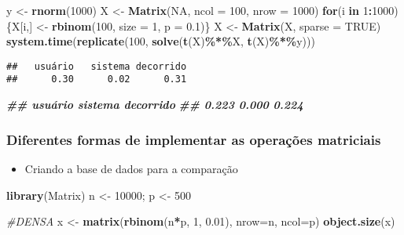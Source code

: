 \documentclass[
]{article}
\newenvironment{Shaded}{\begin{snugshade}}{\end{snugshade}}
\newcommand{\AttributeTok}[1]{\textcolor[rgb]{0.13,0.29,0.53}{#1}}
\newcommand{\CommentTok}[1]{\textcolor[rgb]{0.56,0.35,0.01}{\textit{#1}}}
\newcommand{\ConstantTok}[1]{\textcolor[rgb]{0.56,0.35,0.01}{#1}}
\newcommand{\ControlFlowTok}[1]{\textcolor[rgb]{0.13,0.29,0.53}{\textbf{#1}}}
\newcommand{\DecValTok}[1]{\textcolor[rgb]{0.00,0.00,0.81}{#1}}
\newcommand{\DocumentationTok}[1]{\textcolor[rgb]{0.56,0.35,0.01}{\textbf{\textit{#1}}}}
\newcommand{\FloatTok}[1]{\textcolor[rgb]{0.00,0.00,0.81}{#1}}
\newcommand{\FunctionTok}[1]{\textcolor[rgb]{0.13,0.29,0.53}{\textbf{#1}}}
\newcommand{\NormalTok}[1]{#1}
\newcommand{\OtherTok}[1]{\textcolor[rgb]{0.56,0.35,0.01}{#1}}
\newcommand{\SpecialCharTok}[1]{\textcolor[rgb]{0.81,0.36,0.00}{\textbf{#1}}}
\providecommand{\tightlist}{%
  \setlength{\itemsep}{0pt}\setlength{\parskip}{0pt}}
\begin{document}
\begin{Shaded}
\begin{Highlighting}[]
\NormalTok{y }\OtherTok{\textless{}{-}} \FunctionTok{rnorm}\NormalTok{(}\DecValTok{1000}\NormalTok{)}
\NormalTok{X }\OtherTok{\textless{}{-}} \FunctionTok{Matrix}\NormalTok{(}\ConstantTok{NA}\NormalTok{, }\AttributeTok{ncol =} \DecValTok{100}\NormalTok{, }\AttributeTok{nrow =} \DecValTok{1000}\NormalTok{)}
\ControlFlowTok{for}\NormalTok{(i }\ControlFlowTok{in} \DecValTok{1}\SpecialCharTok{:}\DecValTok{1000}\NormalTok{) \{X[i,] }\OtherTok{\textless{}{-}} \FunctionTok{rbinom}\NormalTok{(}\DecValTok{100}\NormalTok{, }\AttributeTok{size =} \DecValTok{1}\NormalTok{, }\AttributeTok{p =} \FloatTok{0.1}\NormalTok{)\}}
\NormalTok{X }\OtherTok{\textless{}{-}} \FunctionTok{Matrix}\NormalTok{(X, }\AttributeTok{sparse =} \ConstantTok{TRUE}\NormalTok{)}
\FunctionTok{system.time}\NormalTok{(}\FunctionTok{replicate}\NormalTok{(}\DecValTok{100}\NormalTok{, }\FunctionTok{solve}\NormalTok{(}\FunctionTok{t}\NormalTok{(X)}\SpecialCharTok{\%*\%}\NormalTok{X, }\FunctionTok{t}\NormalTok{(X)}\SpecialCharTok{\%*\%}\NormalTok{y)))}
\end{Highlighting}
\end{Shaded}

\begin{verbatim}
##   usuário   sistema decorrido 
##      0.30      0.02      0.31
\end{verbatim}

\begin{Shaded}
\begin{Highlighting}[]
\DocumentationTok{\#\# usuário sistema decorrido}
\DocumentationTok{\#\# 0.223 0.000 0.224}
\end{Highlighting}
\end{Shaded}

\hypertarget{diferentes-formas-de-implementar-as-operauxe7uxf5es-matriciais}{%
\subsubsection{Diferentes formas de implementar as operações
matriciais}\label{diferentes-formas-de-implementar-as-operauxe7uxf5es-matriciais}}

\begin{itemize}
\tightlist
\item
  Criando a base de dados para a comparação
\end{itemize}

\begin{Shaded}
\begin{Highlighting}[]
\FunctionTok{library}\NormalTok{(Matrix)}
\NormalTok{n }\OtherTok{\textless{}{-}} \DecValTok{10000}\NormalTok{; p }\OtherTok{\textless{}{-}} \DecValTok{500}

\CommentTok{\#DENSA}
\NormalTok{x }\OtherTok{\textless{}{-}} \FunctionTok{matrix}\NormalTok{(}\FunctionTok{rbinom}\NormalTok{(n}\SpecialCharTok{*}\NormalTok{p, }\DecValTok{1}\NormalTok{, }\FloatTok{0.01}\NormalTok{), }\AttributeTok{nrow=}\NormalTok{n, }\AttributeTok{ncol=}\NormalTok{p)}
\FunctionTok{object.size}\NormalTok{(x)}
\end{Highlighting}
\end{Shaded}
\end{document}
